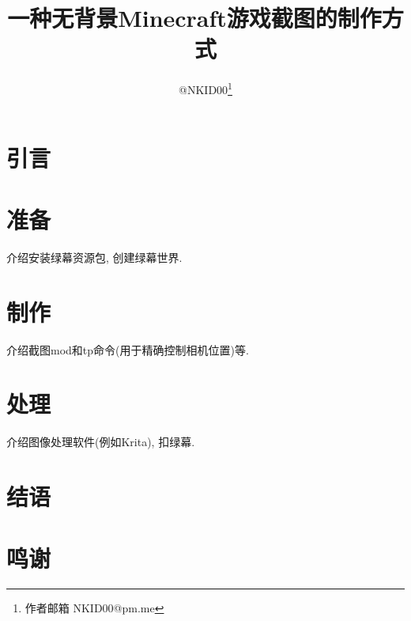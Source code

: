 \documentclass{article}
\title{一种无背景Minecraft游戏截图的制作方式}
\author{@NKID00\footnote{作者邮箱 NKID00@pm.me}}
\date{}
\begin{document}
    \maketitle

    \section{引言}

    \section{准备}
    介绍安装绿幕资源包, 创建绿幕世界.

    \section{制作}
    介绍截图mod和tp命令(用于精确控制相机位置)等.

    \section{处理}
    介绍图像处理软件(例如Krita), 扣绿幕.

    \section{结语}

    \section*{鸣谢}
    
    \begin{thebibliography}{99}
    \end{thebibliography}
\end{document}
